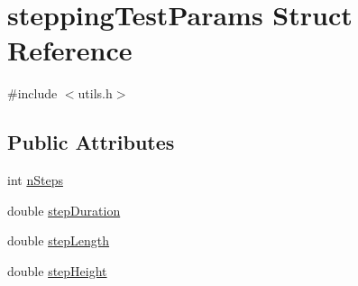 \hypertarget{structsteppingTestParams}{\section{stepping\-Test\-Params \-Struct \-Reference}
\label{structsteppingTestParams}
}


{\ttfamily \#include $<$utils.\-h$>$}

\subsection*{\-Public \-Attributes}
\begin{DoxyCompactItemize}
\item 
int \hyperlink{structsteppingTestParams_aa3a8b8b10e589919331ac9123d9276dc}{n\-Steps}
\item 
double \hyperlink{structsteppingTestParams_ab713c909b480eb82d614340836639fa4}{step\-Duration}
\item 
double \hyperlink{structsteppingTestParams_aa20658768b31d91b09d9225d0fbf0df2}{step\-Length}
\item 
double \hyperlink{structsteppingTestParams_aa40d952e16a8c4ea0c48983fbc3b95b2}{step\-Height}
\end{DoxyCompactItemize}


